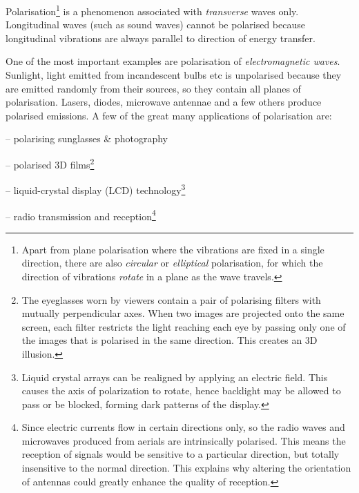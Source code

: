 Polarisation\footnote[][-10cm]{\piste Apart from plane polarisation where the vibrations are fixed in a single direction, there are also \emph{circular} or \emph{elliptical} polarisation, for which the direction of vibrations \emph{rotate} in a plane as the wave travels.} is a phenomenon associated with \emph{transverse} waves only. Longitudinal waves (such as sound waves) cannot be polarised because longitudinal vibrations are always parallel to direction of energy transfer.

One of the most important examples are polarisation of \emph{electromagnetic waves}. Sunlight, light emitted from incandescent bulbs etc is unpolarised because they are emitted randomly from their sources, so they contain all planes of polarisation. Lasers, diodes, microwave antennae and a few others produce polarised emissions. 
A few of the great many applications of polarisation are:

\begin{compactitem}
	\item[--] polarising sunglasses \& photography 
	
	\item[--] polarised 3D films\footnote[][-6.5cm]{The eyeglasses worn by viewers contain a pair of polarising filters with mutually perpendicular axes. When two images are projected onto the same screen, each filter restricts the light reaching each eye by passing only one of the images that is polarised in the same direction. This creates an 3D illusion.}
	
	\item[--] liquid-crystal display (LCD) technology\footnote[][-4cm]{Liquid crystal arrays can be realigned by applying an electric field. This causes the axis of polarization to rotate, hence backlight may be allowed to pass or be blocked, forming dark patterns of the display.}
	
	\item[--] radio transmission and reception\footnote[][-2cm]{Since electric currents flow in certain directions only, so the radio waves and microwaves produced from aerials are intrinsically polarised. This means the reception of signals would be sensitive to a particular direction, but totally insensitive to the normal direction. This explains why altering the orientation of antennas could greatly enhance the quality of reception.}
\end{compactitem}

